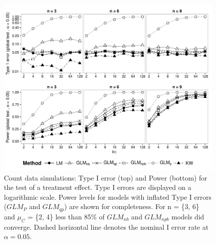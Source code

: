 \begin{landscape}
\begin{figure}
  \centering
  \includegraphics[width = 1.05\textwidth]{chapters/usetheglm/p_glob_c.pdf}
  \caption[Count data simulations: Type I error and Power for the test of a treatment effect.]{Count data simulations: Type I error (top) and Power (bottom) for the test of a treatment effect.
  Type I errors are displayed on a logarithmic scale.
  Power levels for models with inflated Type I errors ($GLM_P$ and $GLM_{qp}$) are shown for completeness. 
  For n = \{3, 6\} and $\mu_C$ = \{2, 4\} less than 85\% of $GLM_{nb}$ and $GLM_{npb}$ models did converge.
  Dashed horizontal line denotes the nominal I error rate at $\alpha = 0.05$.
  }
  \label{fig:usetheglm:p_glob_c}
\end{figure}
\end{landscape}


